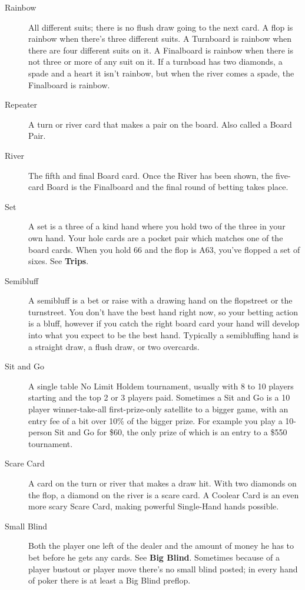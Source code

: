 \begin{description}
\item[Rainbow] All different suits; there is no flush
draw going to the next card. A flop is rainbow when there's three
different suits. A Turnboard is rainbow when there are four different
suits on it. A Finalboard is rainbow when there is not
three or more of any suit on it. If a turnboad has two diamonds, a
spade and a heart it isn't rainbow, but when the river comes a spade,
the Finalboard is rainbow.

\item[Repeater] A turn or river card that makes a pair on the
board. Also called a Board Pair.

\item[River] The fifth and final Board card. Once the River has been
shown, the five-card Board is the Finalboard and the final round of
betting takes place.

\item[Set] A set is a three of a kind hand where you hold two of the
three in your own hand. Your hole cards are a pocket pair which
matches one of the board cards. When you hold 66 and the flop is A63,
you've flopped a set of sixes. See \textbf{Trips}.

\item[Semibluff] A semibluff is a bet or raise with a drawing hand on
the flopstreet or the turnstreet. You don't have the best hand right
now, so your betting action is a bluff, however if you catch the right
board card your hand will develop into what you expect to be the best
hand. Typically a semibluffing hand is a straight draw, a flush draw,
or two overcards.

\item[Sit and Go] A single table No Limit Holdem tournament, usually
with 8 to 10 players starting and the top 2 or 3 players
paid. Sometimes a Sit and Go is a 10 player winner-take-all
first-prize-only satellite to a bigger game, with an entry fee of a
bit over 10\% of the bigger prize. For example you play a 10-person
Sit and Go for \$60, the only prize of which is an entry to a \$550
tournament.

\item[Scare Card] A card on the turn or river that makes a draw hit.
With two diamonds on the flop, a diamond on the river is a scare card.
A Coolear Card is an even more scary Scare Card, making powerful
Single-Hand hands possible.

\item[Small Blind] Both the player one left of the dealer and the
amount of money he has to bet before he gets any cards. See
\textbf{Big Blind}. Sometimes because of a player bustout or player
move there's no small blind posted; in every hand of poker there is at
least a Big Blind preflop.


\end{description}
